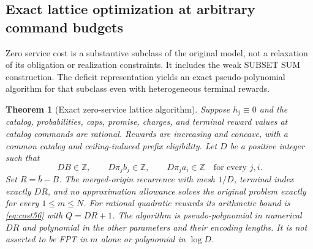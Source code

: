 \documentclass[11pt,letterpaper]{article}
\newtheorem{theorem}{Theorem}[section]
\theoremstyle{definition}\newtheorem{remark}[theorem]{Remark}
\begin{document}
\subsection{Exact lattice optimization at arbitrary command budgets}\label{sec:lattice56}
Zero service cost is a substantive subclass of the original model, not a relaxation of its obligation or realization constraints. It includes the weak SUBSET SUM construction. The deficit representation yields an exact pseudo-polynomial algorithm for that subclass even with heterogeneous terminal rewards.

\begin{theorem}[Exact zero-service lattice algorithm]\label{thm:lattice56}
Suppose $h_j\equiv0$ and the catalog, probabilities, caps, promise, charges, and terminal reward values at catalog commands are rational. Rewards are increasing and concave, with a common catalog and ceiling-induced prefix eligibility. Let $D$ be a positive integer such that
\begin{equation}\label{eq:latticeassumption56}
 DB\in\mathbb Z,\qquad D\pi_jb_j\in\mathbb Z,\qquad
 D\pi_ja_i\in\mathbb Z\quad\text{for every }j,i.
\end{equation}
Set $R=\bar b-B$. The merged-origin recurrence with mesh $1/D$, terminal index exactly $DR$, and no approximation allowance solves the original problem exactly for every $1\leq m\leq N$. For rational quadratic rewards its arithmetic bound is \eqref{eq:cost56} with $Q=DR+1$. The algorithm is pseudo-polynomial in numerical $DR$ and polynomial in the other parameters and their encoding lengths. It is not asserted to be FPT in $m$ alone or polynomial in $\log D$.
\end{theorem}
\end{document}

